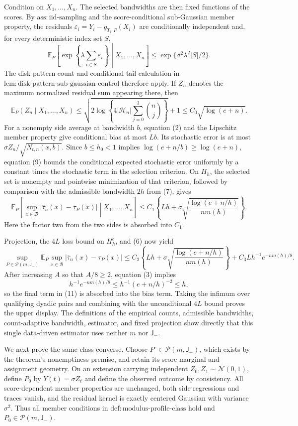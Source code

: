 Condition on \(X_1,\ldots,X_n\).  The selected bandwidths are then fixed functions of the scores.  By \(\mathrm{ass:iid\text{-}sampling}\) and the score-conditional sub-Gaussian member property, the residuals \(\varepsilon_i=Y_i-g_{T_i,P}(X_i)\) are conditionally independent and, for every deterministic index set \(S\),
\[
 \mathbb E_P\!\left[\exp\!\left\{\lambda\sum_{i\in S}\varepsilon_i\right\}\middle|X_1,\ldots,X_n\right]
 \le \exp\{\sigma^2\lambda^2|S|/2\}. \tag{8}
\]
The disk-pattern count and conditional tail calculation in \(\mathrm{lem:disk\text{-}pattern\text{-}sub\text{-}gaussian\text{-}control}\) therefore apply.  If \(Z_n\) denotes the maximum normalized residual sum appearing there, then
\[
 \mathbb E_P(Z_n\mid X_1,\ldots,X_n)
 \le\sqrt{2\log\!\left\{4|\mathcal H_n|\sum_{j=0}^3\binom nj\right\}}+1
 \le C_0\sqrt{\log(e+n)}. \tag{9}
\]
For a nonempty side average at bandwidth \(b\), equation (2) and the Lipschitz member property give conditional bias at most \(Lb\).  Its stochastic error is at most \(\sigma Z_n/\sqrt{N_{t,n}(x,b)}\).  Since \(b\le h_0<1\) implies \(\log(e+n/b)\ge\log(e+n)\), equation (9) bounds the conditional expected stochastic error uniformly by a constant times the stochastic term in the selection criterion.  On \(H_h\), the selected set is nonempty and pointwise minimization of that criterion, followed by comparison with the admissible bandwidth \(2h\) from (7), gives
\[
 \mathbb E_P\!\left[\sup_{x\in\mathcal B}|\widehat\tau_n(x)-\tau_P(x)|\middle|X_1,\ldots,X_n\right]
 \le C_1\left\{Lh+\sigma\sqrt{\frac{\log(e+n/h)}{nm(h)}}\right\}. \tag{10}
\]
Here the factor two from the two sides is absorbed into \(C_1\).

Projection, the \(4L\) loss bound on \(H_h^c\), and (6) now yield
\[
 \sup_{P\in\mathcal P(m,\mathsf J_{-})}
 \mathbb E_P\sup_{x\in\mathcal B}|\overline\tau_n(x)-\tau_P(x)|
 \le C_2\left\{Lh+\sigma\sqrt{\frac{\log(e+n/h)}{nm(h)}}\right\}
 +C_3Lh^{-1}e^{-nm(h)/8}. \tag{11}
\]
After increasing \(A\) so that \(A/8\ge2\), equation (3) implies
\[
 h^{-1}e^{-nm(h)/8}
 \le h^{-1}(e+n/h)^{-2}
 \le h,
\]
so the final term in (11) is absorbed into the bias term.  Taking the infimum over qualifying dyadic pairs and combining with the unconditional \(4L\) bound proves the upper display.  The definitions of the empirical counts, admissible bandwidths, count-adaptive bandwidth, estimator, and fixed projection show directly that this single data-driven estimator uses neither \(m\) nor \(\mathsf J_{-}\).

We next prove the same-class converse.  Choose \(P^\circ\in\mathcal P(m,\mathsf J_{-})\), which exists by the theorem's nonemptiness premise, and retain its score marginal and assignment geometry.  On an extension carrying independent \(Z_0,Z_1\sim\mathcal N(0,1)\), define \(P_0\) by \(Y(t)=\sigma Z_t\) and define the observed outcome by consistency.  All score-dependent member properties are unchanged, both side regressions and traces vanish, and the residual kernel is exactly centered Gaussian with variance \(\sigma^2\).  Thus all member conditions in \(\mathrm{def:modulus\text{-}profile\text{-}class}\) hold and \(P_0\in\mathcal P(m,\mathsf J_{-})\).

